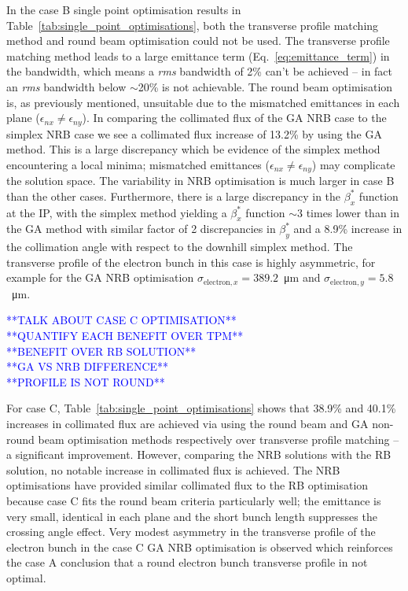 \documentclass[../main.tex]{subfiles}
\begin{document}
In the case B single point optimisation results in Table~\ref{tab:single_point_optimisations}, both the transverse profile matching method and round beam optimisation could not be used. The transverse profile matching method leads to a large emittance term (Eq.~\ref{eq:emittance_term}) in the bandwidth, which means a \textit{rms} bandwidth of 2\% can't be achieved -- in fact an \textit{rms} bandwidth below $\sim$20\% is not achievable. The round beam optimisation is, as previously mentioned, unsuitable due to the mismatched emittances in each plane ($\epsilon_{nx}\neq\epsilon_{ny}$). In comparing the collimated flux of the GA NRB case to the simplex NRB case we see a collimated flux increase of 13.2\% by using the GA method. This is a large discrepancy which be evidence of the simplex method encountering a local minima; mismatched emittances ($\epsilon_{nx}\neq\epsilon_{ny}$) may complicate the solution space. The variability in NRB optimisation is much larger in case B than the other cases. Furthermore, there is a large discrepancy in the $\beta_{x}^{*}$ function at the IP, with the simplex method yielding a $\beta_{x}^{*}$ function $\sim3$ times lower than in the GA method with similar factor of 2 discrepancies in $\beta_{y}^{*}$ and a 8.9\% increase in the collimation angle with respect to the downhill simplex method. The transverse profile of the electron bunch in this case is highly asymmetric, for example for the GA NRB optimisation $\sigma_{\mathrm{electron},x} = 389.2$~\si{\micro\meter} and $\sigma_{\mathrm{electron},y} = 5.8$~\si{\micro\meter}.

\textcolor{blue}{**TALK ABOUT CASE C OPTIMISATION**\\ **QUANTIFY EACH BENEFIT OVER TPM** \\ **BENEFIT OVER RB SOLUTION** \\ **GA VS NRB DIFFERENCE** \\ **PROFILE IS NOT ROUND**}

For case C, Table~\ref{tab:single_point_optimisations} shows that 38.9\% and 40.1\% increases in collimated flux are achieved via using the round beam and GA non-round beam optimisation methods respectively over transverse profile matching -- a significant improvement. However, comparing the NRB solutions with the RB solution, no notable increase in collimated flux is achieved. The NRB optimisations have provided similar collimated flux to the RB optimisation because case C fits the round beam criteria particularly well; the emittance is very small, identical in each plane and the short bunch length suppresses the crossing angle effect. Very modest asymmetry in the transverse profile of the electron bunch in the case C GA NRB optimisation is observed which reinforces the case A conclusion that a round electron bunch transverse profile in not optimal.      
\end{document}
